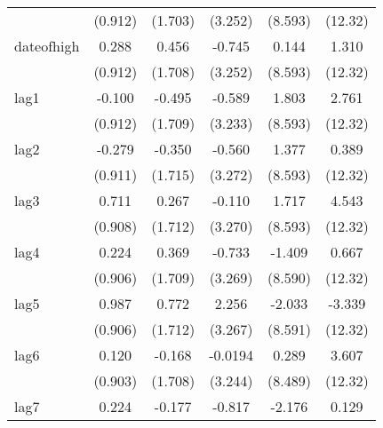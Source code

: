 {\begin{tabular}{l*{5}{c}}
            &     (0.912)         &     (1.703)         &     (3.252)         &     (8.593)         &     (12.32)         \\
[1em]
dateofhigh  &       0.288         &       0.456         &      -0.745         &       0.144         &       1.310         \\
            &     (0.912)         &     (1.708)         &     (3.252)         &     (8.593)         &     (12.32)         \\
[1em]
lag1        &      -0.100         &      -0.495         &      -0.589         &       1.803         &       2.761         \\
            &     (0.912)         &     (1.709)         &     (3.233)         &     (8.593)         &     (12.32)         \\
[1em]
lag2        &      -0.279         &      -0.350         &      -0.560         &       1.377         &       0.389         \\
            &     (0.911)         &     (1.715)         &     (3.272)         &     (8.593)         &     (12.32)         \\
[1em]
lag3        &       0.711         &       0.267         &      -0.110         &       1.717         &       4.543         \\
            &     (0.908)         &     (1.712)         &     (3.270)         &     (8.593)         &     (12.32)         \\
[1em]
lag4        &       0.224         &       0.369         &      -0.733         &      -1.409         &       0.667         \\
            &     (0.906)         &     (1.709)         &     (3.269)         &     (8.590)         &     (12.32)         \\
[1em]
lag5        &       0.987         &       0.772         &       2.256         &      -2.033         &      -3.339         \\
            &     (0.906)         &     (1.712)         &     (3.267)         &     (8.591)         &     (12.32)         \\
[1em]
lag6        &       0.120         &      -0.168         &     -0.0194         &       0.289         &       3.607         \\
            &     (0.903)         &     (1.708)         &     (3.244)         &     (8.489)         &     (12.32)         \\
[1em]
lag7        &       0.224         &      -0.177         &      -0.817         &      -2.176         &       0.129         \\

\end{tabular}}
